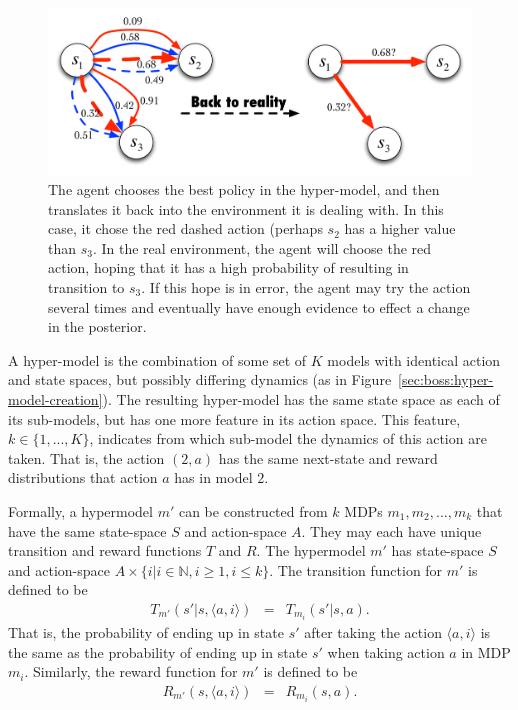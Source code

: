 \begin{figure}[t]
\begin{center}
\includegraphics[width=0.75\linewidth]{figures/hyper-to-real}
\caption{The agent chooses the best policy in the hyper-model, and then translates it back into the environment it is dealing with. In this case, it chose the red dashed action (perhaps $s_2$ has a higher value than $s_3$. In the real environment, the agent will choose the red action, hoping that it has a high probability of resulting in transition to $s_3$. If this hope is in error, the agent may try the action several times and eventually have enough evidence to effect a change in the posterior.}
\label{sec:boss:hyper-to-real}
\end{center}
\end{figure}

A hyper-model is the combination of some set of $K$ models with identical action and state spaces, but possibly differing dynamics (as in Figure~\ref{sec:boss:hyper-model-creation}). The resulting hyper-model has the same state space as each of its sub-models, but has one more feature in its action space. This feature, $k\in\{1,...,K\}$, indicates from which sub-model the dynamics of this action are taken. That is, the action $(2, a)$ has the same next-state and reward distributions that action $a$ has in model $2$.

Formally, a hypermodel $m'$ can be constructed from $k$ MDPs $m_1, m_2, ... , m_k$ that have the same state-space $S$ and action-space $A$. They may each have unique transition and reward functions $T$ and $R$. The hypermodel $m'$ has state-space $S$ and action-space $A \times \{i|i\in \mathbb{N},i\geq 1, i\leq k\}$. The transition function for $m'$ is defined to be
\begin{eqnarray}
T_{m'}(s'|s,\langle a, i \rangle) &=& T_{m_i}(s'|s, a).
\end{eqnarray}
That is, the probability of ending up in state $s'$ after taking the action $\langle a, i\rangle$ is the same as the probability of ending up in state $s'$ when taking action $a$ in MDP $m_i$. Similarly, the reward function for $m'$ is defined to be
\begin{eqnarray}
R_{m'}(s,\langle a, i \rangle) &=& R_{m_i}(s, a).
\end{eqnarray}


